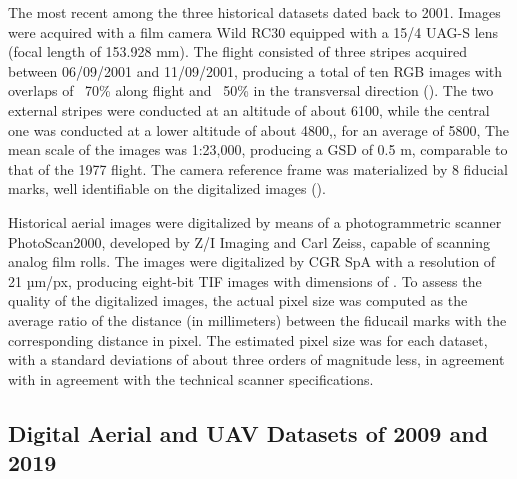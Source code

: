 The most recent among the three historical datasets dated back to 2001. Images were
acquired with a film camera Wild RC30 equipped with a 15/4 UAG-S lens (focal length
of 153.928 mm). The flight consisted of three stripes acquired between 06/09/2001 and
11/09/2001, producing a total of ten RGB images with overlaps of ~70\% along flight and
~50\% in the transversal direction (). The two external stripes were conducted at an
altitude of about \SI{6100}{\masl}, while the central one was conducted at a lower altitude of
about \SI{4800}{\masl},, for an average of \SI{5800}{\masl}, The mean scale of the images was 1:23,000, producing a GSD of 0.5 m, comparable to that of the 1977 flight. 
The camera reference frame was materialized by 8 fiducial marks, well identifiable on the digitalized images ().

Historical aerial images were digitalized by means of a photogrammetric scanner PhotoScan2000, developed by Z/I Imaging and Carl Zeiss, capable of scanning analog film rolls. 
The images were digitalized by CGR SpA with a resolution of 21 µm/px, producing eight-bit TIF 
images with dimensions of . 
To assess the quality of the digitalized images, the actual pixel size was computed as the average ratio of the distance (in millimeters) between the fiducail marks with the corresponding distance in pixel. The estimated pixel size was  for each dataset, with a standard deviations of about three orders of magnitude less, in agreement with in agreement with the technical scanner specifications.

\subsection{Digital Aerial and UAV Datasets of 2009 and 2019}

